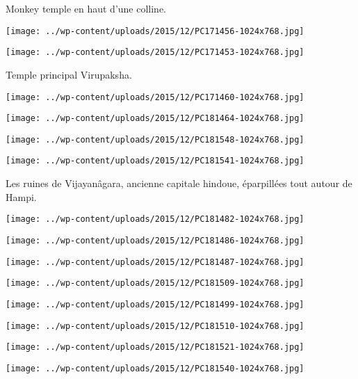 Monkey temple en haut d'une colline.
\begin{center} \texttt{[image: ../wp-content/uploads/2015/12/PC171456-1024x768.jpg]} \end{center}
\begin{center} \texttt{[image: ../wp-content/uploads/2015/12/PC171453-1024x768.jpg]} \end{center}

Temple principal Virupaksha.
\begin{center} \texttt{[image: ../wp-content/uploads/2015/12/PC171460-1024x768.jpg]} \end{center}
\begin{center} \texttt{[image: ../wp-content/uploads/2015/12/PC181464-1024x768.jpg]} \end{center}
\begin{center} \texttt{[image: ../wp-content/uploads/2015/12/PC181548-1024x768.jpg]} \end{center}
\begin{center} \texttt{[image: ../wp-content/uploads/2015/12/PC181541-1024x768.jpg]} \end{center}

Les ruines de Vijayanâgara, ancienne capitale hindoue, éparpillées tout autour de Hampi. 
\begin{center} \texttt{[image: ../wp-content/uploads/2015/12/PC181482-1024x768.jpg]} \end{center}
\begin{center} \texttt{[image: ../wp-content/uploads/2015/12/PC181486-1024x768.jpg]} \end{center}
\begin{center} \texttt{[image: ../wp-content/uploads/2015/12/PC181487-1024x768.jpg]} \end{center}
\begin{center} \texttt{[image: ../wp-content/uploads/2015/12/PC181509-1024x768.jpg]} \end{center}
\begin{center} \texttt{[image: ../wp-content/uploads/2015/12/PC181499-1024x768.jpg]} \end{center}
\begin{center} \texttt{[image: ../wp-content/uploads/2015/12/PC181510-1024x768.jpg]} \end{center}
\begin{center} \texttt{[image: ../wp-content/uploads/2015/12/PC181521-1024x768.jpg]} \end{center}
\begin{center} \texttt{[image: ../wp-content/uploads/2015/12/PC181540-1024x768.jpg]} \end{center}

